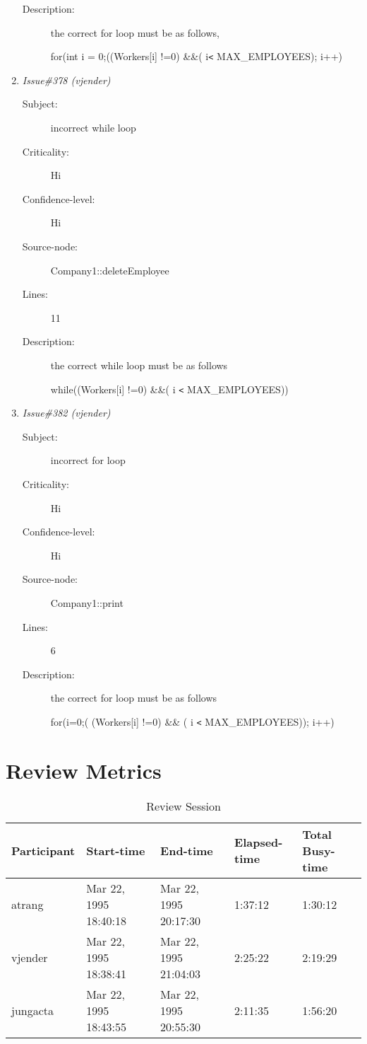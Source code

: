 \begin{enumerate}
\begin{description}
\item [Description:] the correct for loop must be as follows,

for(int i = 0;((Workers[i] !=0) \&\&( i{\tt <} MAX\_EMPLOYEES); i++)
\end{description}
\item {\it Issue\#378 (vjender)}
\begin{description}
\item [Subject:] incorrect while loop
\item [Criticality:] Hi
\item [Confidence-level:] Hi
\item [Source-node:] Company1::deleteEmployee

\item [Lines:] 11

\item [Description:] the correct while loop must be as follows

while((Workers[i] !=0) \&\&( i {\tt <} MAX\_EMPLOYEES))
\end{description}
\item {\it Issue\#382 (vjender)}
\begin{description}
\item [Subject:] incorrect for loop
\item [Criticality:] Hi
\item [Confidence-level:] Hi
\item [Source-node:] Company1::print

\item [Lines:] 6

\item [Description:] the correct for loop must be as follows

for(i=0;( (Workers[i] !=0) \&\& ( i {\tt <} MAX\_EMPLOYEES)); i++)
\end{description}
\end{enumerate}
\section{Review Metrics}
\begin{table}[hb]
\begin{center}
\begin{tabular}{|l|l|l|l|l|}
\hline
Participant & Start-time & End-time & Elapsed-time & Total Busy-time \\
\hline
atrang & Mar 22, 1995 18:40:18 & Mar 22, 1995 20:17:30 & 1:37:12 & 1:30:12 \\
vjender & Mar 22, 1995 18:38:41 & Mar 22, 1995 21:04:03 & 2:25:22 & 2:19:29 \\
jungacta & Mar 22, 1995 18:43:55 & Mar 22, 1995 20:55:30 & 2:11:35 & 1:56:20 \\
\hline
\end{tabular}
\end{center}
\caption{Review Session}
\end{table}


